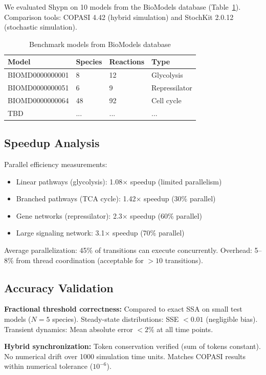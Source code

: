 \documentclass{bioinfo}
\begin{document}
We evaluated Shypn on 10 models from the BioModels database (Table~\ref{tab:models}). Comparison tools: COPASI 4.42 (hybrid simulation) and StochKit 2.0.12 (stochastic simulation).

\begin{table}[h]
\caption{Benchmark models from BioModels database\label{tab:models}}
\centering
\small
\begin{tabular}{llll}
\toprule
Model & Species & Reactions & Type \\
\midrule
BIOMD0000000001 & 8 & 12 & Glycolysis \\
BIOMD0000000051 & 6 & 9 & Repressilator \\
BIOMD0000000064 & 48 & 92 & Cell cycle \\
TBD & ... & ... & ... \\
\bottomrule
\end{tabular}
\end{table}

\subsection{Speedup Analysis}

Parallel efficiency measurements:
\begin{itemize}
\item Linear pathways (glycolysis): 1.08$\times$ speedup (limited parallelism)
\item Branched pathways (TCA cycle): 1.42$\times$ speedup (30\% parallel)
\item Gene networks (repressilator): 2.3$\times$ speedup (60\% parallel)
\item Large signaling network: 3.1$\times$ speedup (70\% parallel)
\end{itemize}

Average parallelization: 45\% of transitions can execute concurrently. Overhead: 5--8\% from thread coordination (acceptable for $>10$ transitions).

\subsection{Accuracy Validation}

\textbf{Fractional threshold correctness:} Compared to exact SSA on small test models ($N=5$ species). Steady-state distributions: SSE $< 0.01$ (negligible bias). Transient dynamics: Mean absolute error $< 2\%$ at all time points.

\textbf{Hybrid synchronization:} Token conservation verified (sum of tokens constant). No numerical drift over 1000 simulation time units. Matches COPASI results within numerical tolerance ($10^{-6}$).
\end{document}
